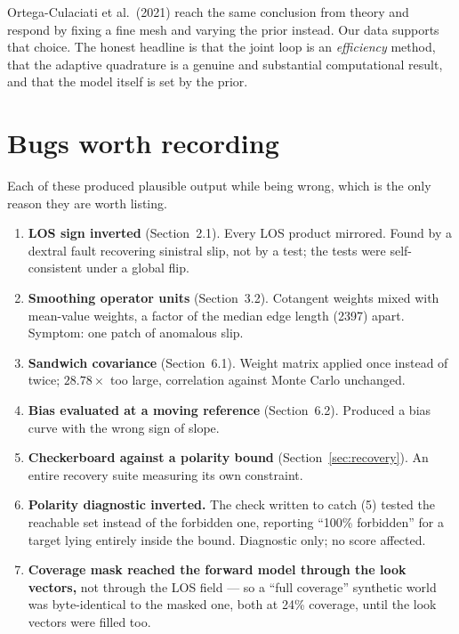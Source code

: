 \documentclass[11pt,a4paper]{article}
\begin{document}
Ortega-Culaciati et al.\ (2021) reach the same conclusion from theory and respond
by fixing a fine mesh and varying the prior instead. Our data supports that
choice. The honest headline is that the joint loop is an \emph{efficiency}
method, that the adaptive quadrature is a genuine and substantial computational
result, and that the model itself is set by the prior.

\section{Bugs worth recording}

Each of these produced plausible output while being wrong, which is the only
reason they are worth listing.

\begin{enumerate}\itemsep3pt
\item \textbf{LOS sign inverted} (Section~2.1). Every LOS product mirrored. Found
      by a dextral fault recovering sinistral slip, not by a test; the tests were
      self-consistent under a global flip.
\item \textbf{Smoothing operator units} (Section~3.2). Cotangent weights mixed
      with mean-value weights, a factor of the median edge length (2397) apart.
      Symptom: one patch of anomalous slip.
\item \textbf{Sandwich covariance} (Section~6.1). Weight matrix applied once
      instead of twice; $28.78\times$ too large, correlation against Monte Carlo
      unchanged.
\item \textbf{Bias evaluated at a moving reference} (Section~6.2). Produced a
      bias curve with the wrong sign of slope.
\item \textbf{Checkerboard against a polarity bound} (Section~\ref{sec:recovery}).
      An entire recovery suite measuring its own constraint.
\item \textbf{Polarity diagnostic inverted.} The check written to catch (5)
      tested the reachable set instead of the forbidden one, reporting ``100\%
      forbidden'' for a target lying entirely inside the bound. Diagnostic only;
      no score affected.
\item \textbf{Coverage mask reached the forward model through the look vectors,}
      not through the LOS field --- so a ``full coverage'' synthetic world was
      byte-identical to the masked one, both at 24\% coverage, until the look
      vectors were filled too.
\end{enumerate}
\end{document}
